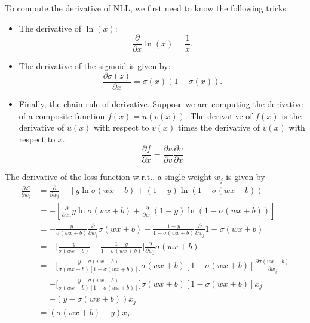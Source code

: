 To compute the derivative of NLL, we first need to know the following tricks:
\begin{itemize}
	\item The derivative of $\ln (x)$:
$$\frac{\partial }{\partial x}\ln (x) = \frac{1}{x}.$$
\item The derivative of the sigmoid is given by:
$$\frac{\partial \sigma(z)}{\partial x} = \sigma(x)(1-\sigma(x)).$$
\item Finally, the chain rule of derivative. Suppose we are computing the derivative of a composite function $f(x) = u(v(x))$. The derivative of $f(x)$ is the derivative of $u(x)$ with respect to $v(x)$ times the derivative of $v(x)$ with respect to $x$.
$$\frac{\partial f}{\partial x} = \frac{\partial u}{\partial v} \frac{\partial v}{\partial x}$$
\end{itemize}
The derivative of the loss function w.r.t., a single weight $w_j$ is given by
\begin{align*}
	\frac{\partial \mathcal{L}}{\partial w_j} &= \frac{\partial }{\partial w_j} -[y\ln \sigma(wx + b)+(1-y) \ln (1-\sigma(wx+b))]\\
											  &=  -[\frac{\partial }{\partial w_j}y\ln \sigma(wx + b)+\frac{\partial }{\partial w_j}(1-y) \ln (1-\sigma(wx+b))]\\
											  &= -\frac{y}{\sigma(wx + b)}\frac{\partial }{\partial w_j}\sigma(wx + b) - \frac{1-y}{1-\sigma(wx+b)} \frac{\partial }{\partial w_j}1-\sigma(wx+b)\\
											  &= -\bigg[\frac{y}{\sigma(wx + b)}-\frac{1-y}{1-\sigma(wx + b)}\bigg]\frac{\partial }{\partial w_j}\sigma(wx + b)\\
											  &= -\bigg[\frac{y-\sigma(wx + b)}{\sigma(wx + b)[1-\sigma(wx + b)]}\bigg]\sigma(wx + b)[1-\sigma(wx + b)]\frac{\partial \sigma(wx + b)}{\partial w_j}\\
											  &= -\bigg[\frac{y-\sigma(wx + b)}{\sigma(wx + b)[1-\sigma(wx + b)]}\bigg]\sigma(wx + b)[1-\sigma(wx + b)]x_j\\ 
											  &= -( y-\sigma(wx + b) )x_j\\
											  &= ( \sigma(wx + b)-y )x_j.
\end{align*}





